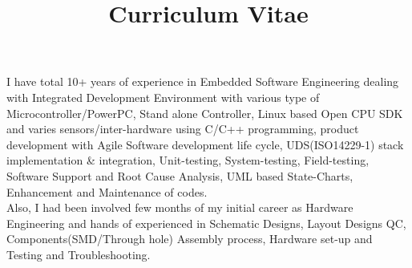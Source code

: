 \documentclass[a4paper,skipsamekey,12pt,british]{curve}
\title{Curriculum Vitae}
\begin{document}
\makeheaders[c]

I have total 10+ years of experience in Embedded Software Engineering dealing with Integrated Development Environment with various type of Microcontroller/PowerPC, Stand alone Controller, Linux based Open CPU SDK and varies sensors/inter-hardware using C/C++ programming, product development with Agile Software development life cycle, UDS(ISO14229-1) stack implementation \& integration, Unit-testing, System-testing, Field-testing, Software Support and Root Cause Analysis, UML based State-Charts, Enhancement and Maintenance of codes.\\
Also, I had been involved few months of my initial career as Hardware Engineering and hands of experienced in Schematic Designs, Layout Designs QC, Components(SMD/Through hole) Assembly process, Hardware set-up and Testing and Troubleshooting.
\vspace*{10mm}
\newpage
{}
\newpage


%
\end{document}
